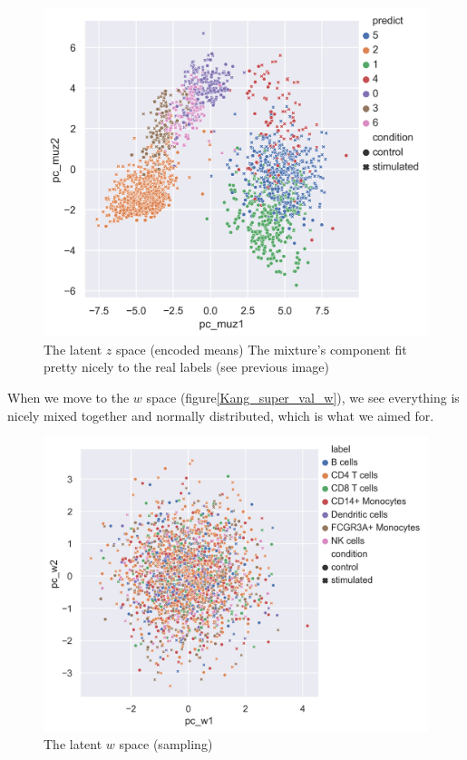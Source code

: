 \documentclass[11pt, a4paper]{report}
\theoremstyle{plain}
\theoremstyle{definition}
\theoremstyle{remark}
\begin{document}
\begin{figure}[h]
\centering
\includegraphics[width=1.1\textwidth]{images/Kang_super_val_mu_z_predict.png}
\caption{
The latent $z$ space (encoded means) The mixture's component fit pretty nicely
to the real labels (see previous image)
}
\label{fig:Kang_super_val_mu_z_predict}
\end{figure}


When we move to the $w$ space (figure\ref{Kang_super_val_w}), we see everything
is nicely mixed together and normally distributed, which is what we aimed for.

\begin{figure}[h]
\centering
\includegraphics[width=1.1\textwidth]{images/Kang_super_val_w.png}
\caption{
The latent $w$ space (sampling)
}
\label{fig:Kang_super_val_mu_z}
\end{figure}
\end{document}
